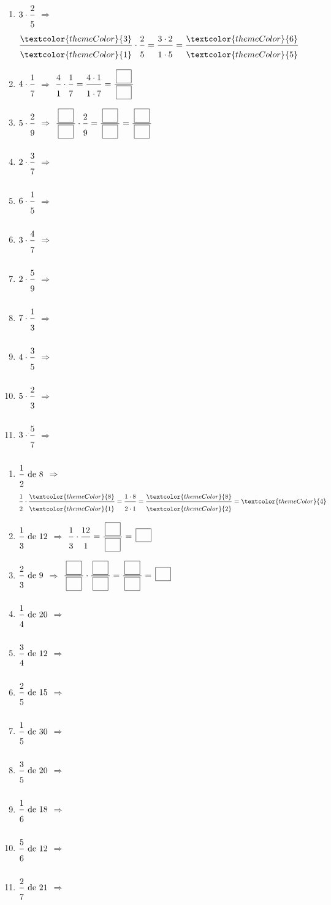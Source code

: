 \begin{enumerate}[leftmargin=*,align=parleft, label=\alph*), itemsep=9pt]
\item $3\cdot\FA{2}{5}$ \quad $\Longrightarrow$ \quad $\FA{\textcolor{themeColor}{3}}{\textcolor{themeColor}{1}}\cdot\FA{2}{5}=\FA{3 \cdot 2}{1 \cdot 5}=\FA{\textcolor{themeColor}{6}}{\textcolor{themeColor}{5}}$
\item $4\cdot\FA{1}{7}$ \quad $\Longrightarrow$ \quad $\FA{4}{1}\cdot\FA{1}{7}=\FA{4 \cdot 1}{1 \cdot 7}=\FA{\CaseC}{\CaseC}$
\item $5\cdot\FA{2}{9}$ \quad $\Longrightarrow$ \quad $\FA{\CaseC}{\CaseC}\cdot\FA{2}{9}=\FA{\CaseC}{\CaseC}=\FA{\CaseC}{\CaseC}$
\item $2\cdot\FA{3}{7}$ \quad $\Longrightarrow$
\item $6\cdot\FA{1}{5}$ \quad $\Longrightarrow$
\item $3\cdot\FA{4}{7}$ \quad $\Longrightarrow$
\item $2\cdot\FA{5}{9}$ \quad $\Longrightarrow$
\item $7\cdot\FA{1}{3}$ \quad $\Longrightarrow$
\item $4\cdot\FA{3}{5}$ \quad $\Longrightarrow$
\item $5\cdot\FA{2}{3}$ \quad $\Longrightarrow$
\item $3\cdot\FA{5}{7}$ \quad $\Longrightarrow$
\end{enumerate}
 
\newpage
{}
 
\begin{enumerate}[leftmargin=*,align=parleft, label=\alph*), itemsep=9pt]
\item $\FA{1}{2}\text{ de }8$ \quad $\Longrightarrow$ \quad $\FA{1}{2}\cdot\FA{\textcolor{themeColor}{8}}{\textcolor{themeColor}{1}}=\FA{1 \cdot 8}{2 \cdot 1}=\FA{\textcolor{themeColor}{8}}{\textcolor{themeColor}{2}}=\textcolor{themeColor}{4}$
\item $\FA{1}{3}\text{ de }12$ \quad $\Longrightarrow$ \quad $\FA{1}{3}\cdot\FA{12}{1}=\FA{\CaseC}{\CaseC}=\CaseC$
\item $\FA{2}{3}\text{ de }9$ \quad $\Longrightarrow$ \quad $\FA{\CaseC}{\CaseC}\cdot\FA{\CaseC}{\CaseC}=\FA{\CaseC}{\CaseC}=\CaseC$
\item $\FA{1}{4}\text{ de }20$ \quad $\Longrightarrow$
\item $\FA{3}{4}\text{ de }12$ \quad $\Longrightarrow$
\item $\FA{2}{5}\text{ de }15$ \quad $\Longrightarrow$
\item $\FA{1}{5}\text{ de }30$ \quad $\Longrightarrow$
\item $\FA{3}{5}\text{ de }20$ \quad $\Longrightarrow$
\item $\FA{1}{6}\text{ de }18$ \quad $\Longrightarrow$
\item $\FA{5}{6}\text{ de }12$ \quad $\Longrightarrow$
\item $\FA{2}{7}\text{ de }21$ \quad $\Longrightarrow$
\end{enumerate}
 
